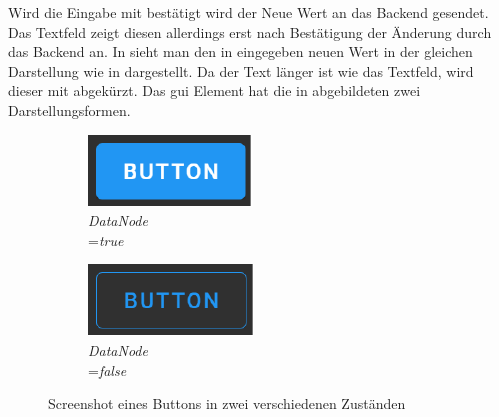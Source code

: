 Wird die Eingabe mit  bestätigt wird der Neue Wert an das Backend gesendet. 
Das Textfeld zeigt diesen allerdings erst nach Bestätigung der Änderung durch das Backend an. 
In  sieht man den in  eingegeben neuen Wert  in der gleichen Darstellung wie in  dargestellt.
Da der Text länger ist wie das Textfeld, wird dieser mit \eigenNameNorm{ \dots} abgekürzt.
Das \ac{gui} Element  hat die in  abgebildeten zwei Darstellungsformen.
\begin{figure}[ht]
  \centering
  \hspace{0.1\textwidth}
  \begin{subfigure}[h]{0.25\textwidth}
    \centering
    \includegraphics[width=\textwidth]{content/hauptteil/umsetzungPoC/frontend/res/buttonTrue.pdf}
    \caption{\emph{DataNode} \\=\emph{true}}
    \label{fig:frontend:poc:button:true}
  \end{subfigure}
  \hfill
  \begin{subfigure}[h]{0.25\textwidth}
    \centering
    \includegraphics[width=\textwidth]{content/hauptteil/umsetzungPoC/frontend/res/buttonFalse.pdf}
    \caption{\emph{DataNode} \\=\emph{false}}
    \label{fig:frontend:poc:button:false}
  \end{subfigure}
  \hspace{0.1\textwidth}
  \caption[Screenshot, Zustände eines Buttons]{Screenshot eines Buttons in zwei verschiedenen Zuständen}
  \label{fig:frontend:poc:button}
\end{figure}
